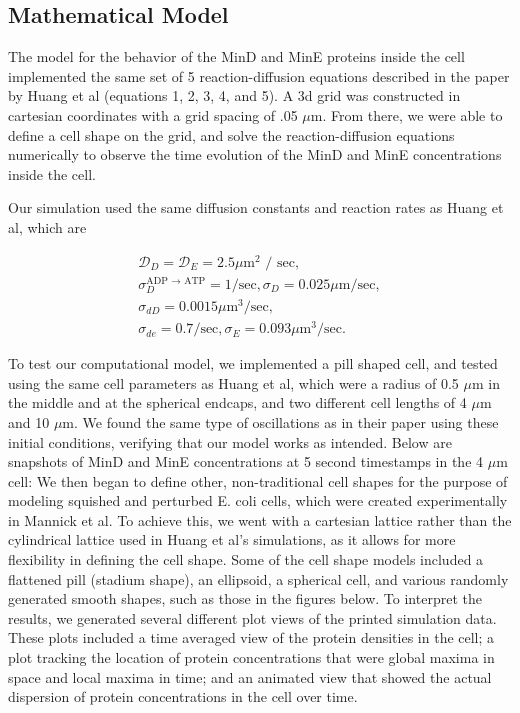 \documentclass[letterpaper,twocolumn,amsmath,amssymb,pre]{revtex4-1}
\begin{document}
\subsection{Mathematical Model} %
The model for the behavior of the MinD and MinE proteins inside the cell
implemented the same set of 5 reaction-diffusion equations described in the paper
by Huang et al (equations 1, 2, 3, 4, and 5). A 3d grid was constructed in
cartesian coordinates with a grid spacing of .05 $\mu$m. From there, we
were able to define a cell shape on the grid, and solve the
reaction-diffusion equations numerically to observe the time evolution of
the MinD and MinE concentrations inside the cell.

Our simulation used the same diffusion constants and reaction rates as
Huang et al, which are

\begin{gather*} %
  \mathcal{D}_D = \mathcal{D}_{E}  = 2.5 \mu \textrm{m$^2$ / sec}, \\
  \sigma_D^{\textrm{ADP $\rightarrow$ ATP}}  = 1/\textrm{sec},  \sigma_D = 0.025 \mu \textrm{m/sec}, \\
  \sigma_{dD}  = 0.0015 \mu \textrm{m$^3$/sec}, \\
  \sigma_{de}  = 0.7/\textrm{sec}, \sigma_E = 0.093 \mu \textrm{m$^3$/sec}.
\end{gather*}

To test our computational model, we implemented a pill shaped cell, and
tested using the same cell parameters as Huang et al, which were a radius
of 0.5 $\mu$m in the middle and at the spherical endcaps, and two different
cell lengths of 4 $\mu$m and 10 $\mu$m. We found the same type of
oscillations as in their paper using these initial conditions, verifying
that our model works as intended. Below are snapshots of MinD and MinE
concentrations at 5 second timestamps in the 4 $\mu$m cell:
\newline
{}
\newline
\newline
We then began to define other, non-traditional cell shapes for the purpose of
modeling squished and perturbed E. coli cells, which were created
experimentally in Mannick et al. To achieve this, we went with a
cartesian lattice rather than the cylindrical lattice used in Huang et 
al's simulations, as it allows for more flexibility in defining the 
cell shape. Some of the cell shape models included a flattened pill
(stadium shape), an ellipsoid, a spherical cell, and various randomly
generated smooth shapes, such as those in the figures below. 
\newline
{}
\newline
\newline
To interpret the results, we generated several different plot views of
the printed simulation data. These plots included a time averaged view
of the protein densities in the cell; a plot tracking the location of
protein concentrations that were global maxima in space and local maxima in 
time; and an animated view that showed the actual dispersion of
protein concentrations in the cell over time. 
\end{document}
